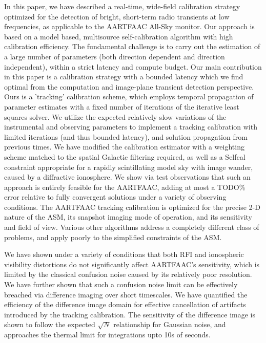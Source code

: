 \documentclass{aa}
\begin{document}
In this  paper, we have  described a real-time, wide-field  calibration strategy
optimized  for the  detection  of  bright, short-term  radio  transients at  low
frequencies, as  applicable to  the AARTFAAC All-Sky  monitor.  Our  approach is
based  on  a  model  based,  multisource self-calibration  algorithm  with  high
calibration efficiency. The fundamental challenge is to carry out the estimation
of  a  large  number  of  parameters (both  direction  dependent  and  direction
independent), within a strict latency  and compute budget. Our main contribution
in this  paper is a  calibration strategy with  a bounded latency which  we find
optimal   from    the   computation   and    image-plane   transient   detection
perspective.  Ours is a  'tracking' calibration  scheme, which  employs temporal
propagation  of parameter estimates  with a  fixed number  of iterations  of the
iterative  least  squares  solver.  We  utilize  the  expected  relatively  slow
variations of the instrumental and  observing parameters to implement a tracking
calibration  with limited iterations  (and thus  bounded latency),  and solution
propagation from previous times. We have modified the calibration estimator with
a weighting scheme  matched to the spatial Galactic  filtering required, as well
as a Selfcal  constraint appropriate for a rapidly  scintillating model sky with
image wander, caused by a  diffractive ionosphere. We show via test observations
that such  an approach is entirely feasible  for the AARTFAAC, adding  at most a
TODO\% error relative to fully convergent solutions under a variety of observing
conditions. The AARTFAAC  tracking calibration is optimized for  the precise 2-D
nature of the  ASM, its snapshot imaging mode of  operation, and its sensitivity
and field of view. Various other algorithms address a completely different class
of problems, and apply poorly to the simplified constraints of the ASM.

We  have shown  under a  variety  of conditions  that both  RFI and  ionospheric
visibility distortions do not significantly affect AARTFAAC's sensitivity, which
is  limited by  the  classical confusion  noise  caused by  its relatively  poor
resolution.  We  have further  shown that  such a confusion  noise limit  can be
effectively  breached via  difference  imaging over  short  timescales. We  have
quantified  the  efficiency  of   the  difference  image  domain  for  effective
cancellation  of   artifacts  introduced  by  the   tracking  calibration.   The
sensitivity of the  difference image is shown to  follow the expected $\sqrt{N}$
relationship  for   Gaussian  noise,  and  approaches  the   thermal  limit  for
integrations upto 10s of seconds.
\end{document}
